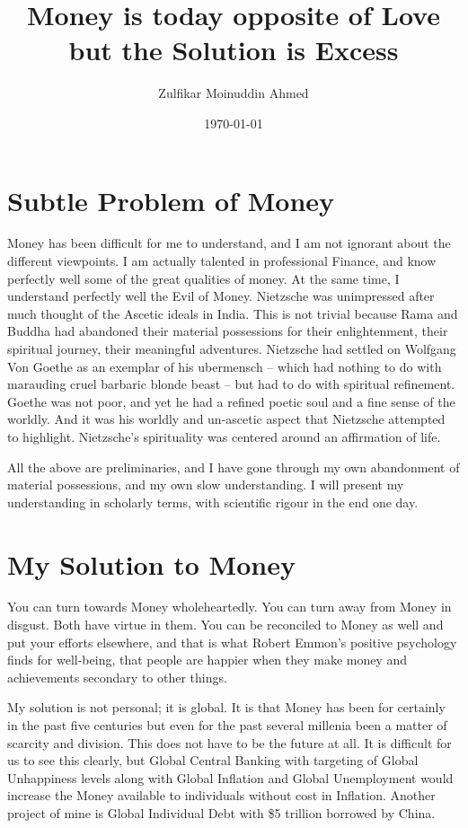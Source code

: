 \documentclass{amsart}
\title{Money is today opposite of Love but the Solution is Excess}
\author{Zulfikar Moinuddin Ahmed}
\date{\today}
\begin{document}
\maketitle
\section{Subtle Problem of Money}
Money has been difficult for me to understand, and I am not ignorant about the different viewpoints.  I am actually talented in professional Finance, and know perfectly well some of the great qualities of money.  At the same time, I understand perfectly well the Evil of Money.  Nietzsche was unimpressed after much thought of the Ascetic ideals in India.  This is not trivial because Rama and Buddha had abandoned their material possessions for their enlightenment, their spiritual journey, their meaningful adventures.  Nietzsche had settled on Wolfgang Von Goethe as an exemplar of his ubermensch -- which had nothing to do with marauding cruel barbaric blonde beast -- but had to do with spiritual refinement.  Goethe was not poor, and yet he had a refined poetic soul and a fine sense of the worldly.  And it was his worldly and un-ascetic aspect that Nietzsche attempted to highlight.  Nietzsche's spirituality was centered around an affirmation of life.  

All the above are preliminaries, and I have gone through my own abandonment of material possessions, and my own slow understanding.  I will present my understanding in scholarly terms, with scientific rigour in the end one day.

\section{My Solution to Money}
You can turn towards Money wholeheartedly.  You can turn away from Money in disgust.  Both have virtue in them.  You can be reconciled to Money as well and put your efforts elsewhere, and that is what Robert Emmon's positive psychology finds for well-being, that people are happier when they make money and achievements secondary to other things.

My solution is not personal; it is global.  It is that Money has been for certainly in the past five centuries but even for the past several millenia been a matter of scarcity and division.  This does not have to be the future at all.  It is difficult for us to see this clearly, but Global Central Banking with targeting of Global Unhappiness levels along with Global Inflation and Global Unemployment would increase the Money available to individuals without cost in Inflation.  Another project of mine is Global Individual Debt with \$5 trillion borrowed by China.
\end{document}

